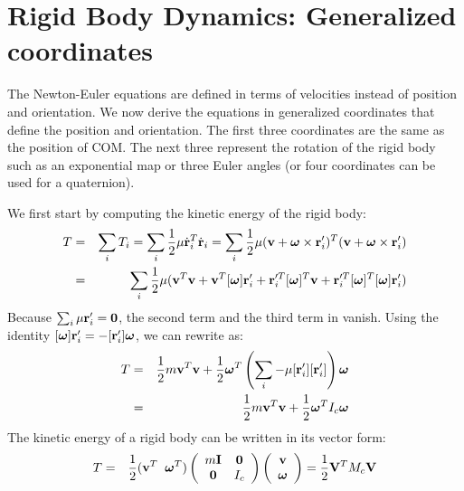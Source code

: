 \section{Rigid Body Dynamics: Generalized coordinates}
\label{sec:rigidbodydyngen}
The Newton-Euler equations are defined in terms of velocities instead of position and orientation. We now derive the equations in generalized coordinates  that define the position and orientation. The first three coordinates are the same as the position of COM. The next three represent the rotation of the rigid body such as an exponential map or three Euler angles (or four coordinates can be used for a quaternion).

We first start by computing the kinetic energy of the rigid body:
\begin{eqnarray}
\label{eq:rigid_kinetic}
T &=& \sum_i T_i = \sum_i \frac{1}{2}  \mathbf{\mu} \dot{\mathbf{r}}_i^{T}
    \dot{\mathbf{r}}_i = \sum_i \frac{1}{2}  \mathbf{\mu} (\mathbf{v} + \bm{\omega}
    \times \mathbf{r}_i')^T (\mathbf{v} + \boldsymbol{\bm{\omega}}
    \times \mathbf{r}_i') \nonumber \\
 &=& \sum_i \frac{1}{2}  \mathbf{\mu} (\mathbf{v}^T\mathbf{v} +
    \mathbf{v}^T [\bm{\omega}] \mathbf{r}_i' + \mathbf{r}_i'^T [\bm{\omega}]^T \mathbf{v} +
    \mathbf{r}_i'^T [\bm{\omega}]^T [\bm{\omega}] \mathbf{r}_i')
\end{eqnarray}
Because $\sum_i \mathbf{\mu}
\mathbf{r}_i' = \mathbf{0}$, the second term and the third term in  vanish. Using the identity $[\bm{\omega}]\mathbf{r}_i' =
-[\mathbf{r}_i']\bm{\omega}$, we can rewrite 
as:
\begin{eqnarray}
\nonumber
T & = & \frac{1}{2} m \mathbf{v}^T\mathbf{v} + \frac{1}{2} \bm{\omega}^T \left ( \sum_i -\mathbf{\mu}
 [\mathbf{r}_i'][\mathbf{r}_i'] \right ) \bm{\omega}\\
 & = & \frac{1}{2} m \mathbf{v}^T\mathbf{v} + \frac{1}{2} \bm{\omega}^T I_c \bm{\omega}
\end{eqnarray}
The kinetic energy of a rigid body can be written in its vector form:
\begin{eqnarray}
\label{eq:kinetic_vec}
T &=& \frac{1}{2} (\mathbf{v}^T \;\; \bm{\omega}^T)
\left(
\begin{array}{cc}
m\mathbf{I} & \mathbf{0} \\
\mathbf{0} & I_c
\end{array}
\right)
\left(
\begin{array}{c}
\mathbf{v} \\
\bm{\omega} 
\end{array}
\right)
 = \frac{1}{2}\mathbf{V}^T M_c \mathbf{V}
\end{eqnarray}
